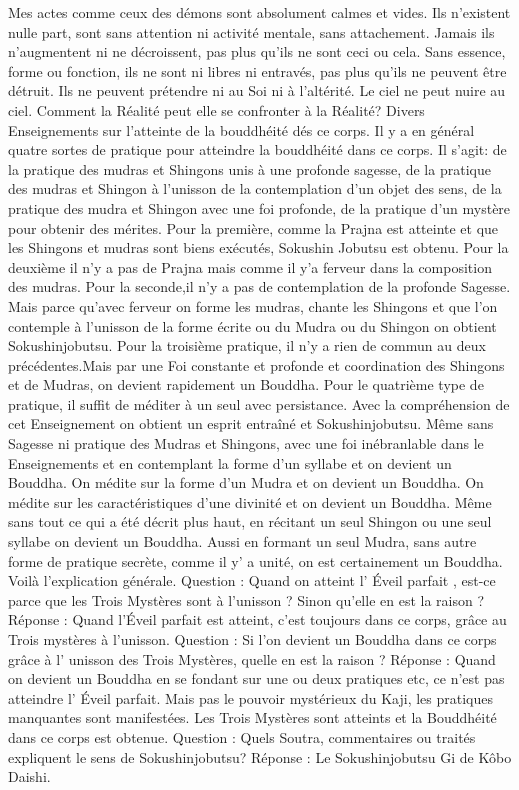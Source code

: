 Mes actes comme ceux des démons sont absolument calmes et vides. Ils n’existent nulle part, sont sans attention ni activité mentale, sans attachement. Jamais ils n'augmentent ni ne décroissent, pas plus qu'ils ne sont ceci ou cela. Sans essence, forme ou fonction, ils ne sont ni libres ni entravés, pas plus qu'ils ne peuvent être détruit. Ils ne peuvent prétendre ni au Soi ni à l'altérité. Le ciel ne peut nuire au ciel. Comment la Réalité peut elle se confronter à la Réalité?
Divers Enseignements sur l'atteinte de la bouddhéité dés ce corps.
Il y a en général quatre sortes de pratique pour atteindre la bouddhéité dans ce corps. Il s'agit:
de la pratique des mudras et Shingons unis à une profonde sagesse,
de la pratique des mudras et Shingon à l'unisson de la contemplation d'un objet des sens,
de la pratique des mudra et Shingon avec une foi profonde,
de la pratique d'un mystère pour obtenir des mérites.
Pour la première, comme la Prajna est atteinte et que les Shingons et mudras sont biens exécutés, Sokushin Jobutsu est obtenu. Pour la deuxième il n'y a pas de Prajna mais comme il y'a ferveur dans la composition des mudras.
Pour la seconde,il n'y a pas de contemplation de la profonde Sagesse. Mais parce qu'avec ferveur on forme les mudras, chante les Shingons et que l'on contemple à l'unisson de la forme écrite ou du Mudra ou du Shingon on obtient Sokushinjobutsu.
Pour la troisième pratique, il n'y a rien de commun au deux précédentes.Mais par une Foi constante et profonde et coordination des Shingons et de Mudras, on devient rapidement un Bouddha.
Pour le quatrième type de pratique, il suffit de méditer à un seul avec persistance. Avec la compréhension de cet Enseignement on obtient un esprit entraîné et Sokushinjobutsu.
Même sans Sagesse ni pratique des Mudras et Shingons, avec une foi inébranlable dans le Enseignements et en contemplant la forme d'un syllabe et on devient un Bouddha. On médite sur la forme d'un Mudra et on devient un Bouddha. On médite sur les caractéristiques d'une divinité et on devient un Bouddha.
Même sans tout ce qui a été décrit plus haut, en récitant un seul Shingon ou une seul syllabe on devient un Bouddha.
Aussi en formant un seul Mudra, sans autre forme de pratique secrète, comme il y' a unité, on est certainement un Bouddha. Voilà l'explication générale.
Question : Quand on atteint l' Éveil parfait , est-ce parce que les Trois Mystères sont à l'unisson ? Sinon qu'elle en est la raison ?
Réponse : Quand l’Éveil parfait est atteint, c'est toujours dans ce corps, grâce au Trois mystères à l'unisson.
Question : Si l'on devient un Bouddha dans ce corps grâce à l' unisson des Trois Mystères, quelle en est la raison ?
Réponse : Quand on devient un Bouddha en se fondant sur une ou deux pratiques etc, ce n'est pas atteindre l' Éveil parfait. Mais pas le pouvoir mystérieux du Kaji, les pratiques manquantes sont manifestées. Les Trois Mystères sont atteints et la Bouddhéité dans ce corps est obtenue.
Question : Quels Soutra, commentaires ou traités expliquent le sens de Sokushinjobutsu?
Réponse : Le Sokushinjobutsu Gi de Kôbo Daishi.

